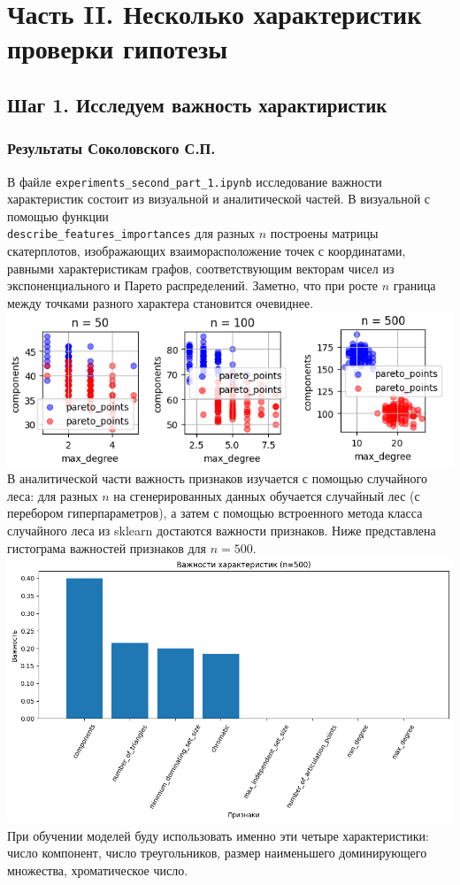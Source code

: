 \documentclass[a4paper,12pt]{article}
\begin{document}
\section{Часть II. Несколько характеристик проверки гипотезы}
\subsection{Шаг 1. Исследуем важность характиристик}
\subsubsection*{Результаты Соколовского С.П.}
В файле \texttt{experiments\_second\_part\_1.ipynb} исследование важности характеристик состоит из визуальной и аналитической частей. В визуальной с помощью функции \\ \texttt{describe\_features\_importances} для разных $n$ построены матрицы скатерплотов, изображающих взаиморасположение точек с координатами, равными характеристикам графов, соответствующим векторам чисел из экспоненциального и Парето распределений. Заметно, что при росте $n$ граница между точками разного характера становится очевиднее. 
\hspace{-10cm} 
\includegraphics[width=\textwidth]{images/plots.png}
\hspace{+10cm} 
В аналитической части важность признаков изучается с помощью случайного леса: для разных $n$ на сгенерированных данных обучается случайный лес (с перебором гиперпараметров), а затем с помощью встроенного метода класса случайного леса из sklearn достаются важности признаков. Ниже представлена гистограма важностей признаков для $n = 500$.
\hspace{-5cm} 
\includegraphics[width=\textwidth]{images/imps.png}
\hspace{+5cm}
При обучении моделей буду использовать именно эти четыре характеристики: число компонент, число треугольников, размер наименьшего доминирующего множества, хроматическое число.
\end{document}
